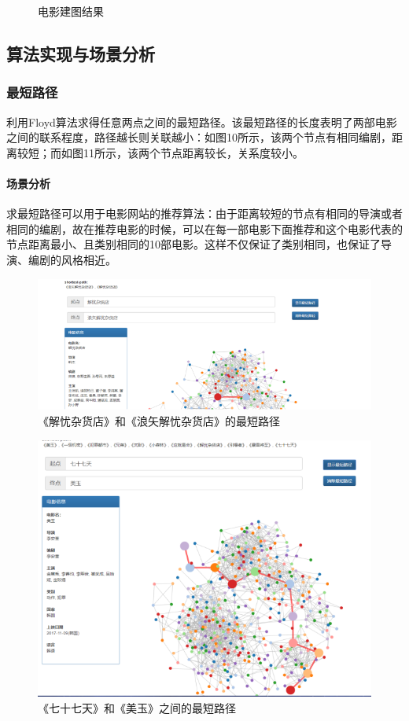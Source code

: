\documentclass[UTF8, onecolumn, a4paper]{article}
\begin{document}
\begin{center}
\begin{figure}[ht]
\begin{minipage}[b]{0.95\linewidth}
\begin{minipage}[b]{0.46\linewidth}
    	\caption{电影建图结果}
    	\end{minipage}
    \end{minipage}
    \end{figure}
\end{center}
\subsection{算法实现与场景分析}
\subsubsection{最短路径}
    利用Floyd算法求得任意两点之间的最短路径。该最短路径的长度表明了两部电影之间的联系程度，路径越长则关联越小：如图10所示，该两个节点有相同编剧，距离较短；而如图11所示，该两个节点距离较长，关系度较小。
    
    \paragraph{场景分析}求最短路径可以用于电影网站的推荐算法：由于距离较短的节点有相同的导演或者相同的编剧，故在推荐电影的时候，可以在每一部电影下面推荐和这个电影代表的节点距离最小、且类别相同的10部电影。这样不仅保证了类别相同，也保证了导演、编剧的风格相近。
\begin{figure}[H]
	\centering
	\includegraphics[width=0.6\linewidth]{../pictures/show8}
	\caption{《解忧杂货店》和《浪矢解忧杂货店》的最短路径}
\end{figure}
\begin{figure}[H]
	\centering
	\includegraphics[width=0.6\linewidth]{../pictures/show9}
	\caption{《七十七天》和《美玉》之间的最短路径}
\end{figure}
\end{document}
